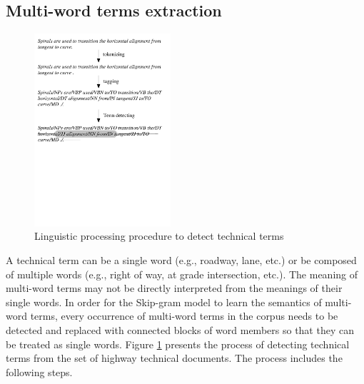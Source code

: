 \documentclass[Journal, InsideFigs, DoubleSpace]{ascelike} %
\begin{document}
\subsection{Multi-word terms extraction}
%
\begin{figure}[t]
	\centering
	\includegraphics[width=0.45\textwidth]{Figure2_term_extraction}
	\caption{Linguistic processing procedure to detect technical terms}
	\label{fig:np_detect}
\end{figure}
%
A technical term can be a single word (e.g., roadway, lane, etc.) or be composed of multiple words (e.g., right of way, at grade intersection, etc.). The meaning of multi-word terms may not be directly interpreted from the meanings of their single words. In order for the Skip-gram model to learn the semantics of multi-word terms, every occurrence of multi-word terms in the corpus needs to be detected and replaced with connected blocks of word members so that they can be treated as single words. Figure \ref{fig:np_detect} presents the process of detecting technical terms from the set of highway technical documents. The process includes the following steps. 
\par
\end{document}
